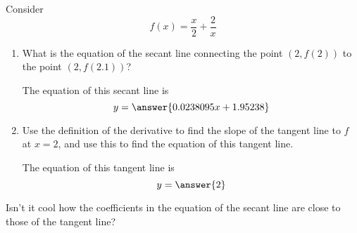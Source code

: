 \documentclass[handout]{ximera}
\begin{document}
\begin{exercise}
Consider 
\[
f(x) = \frac{x}{2}+\frac{2}{x}
\]

\begin{enumerate}
\item What is the equation of the secant line connecting the point $(2,f(2))$ to the point $(2,f(2.1))$? 
\begin{prompt} 
The equation of this secant line is
$$ y = \answer{0.0238095x+1.95238 }$$ 
\end{prompt}

\item  Use the definition of the derivative to find the slope of the tangent line to $f$ at $x=2$, and use this to find the equation of this tangent line.

\begin{prompt} 
The equation of this tangent line is
$$ y = \answer{2}$$ 
\end{prompt}

\end{enumerate}

Isn't it cool how the coefficients in the equation of the secant line are close to those of the tangent line?
\end{exercise}
\end{document}

